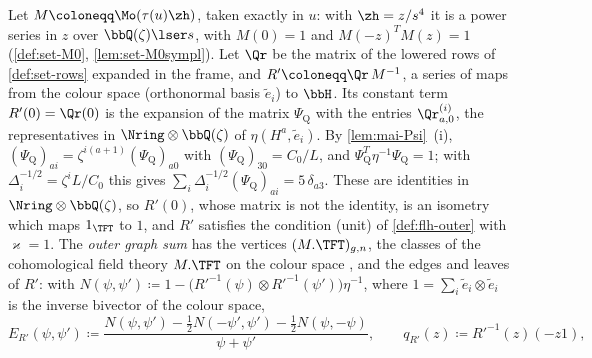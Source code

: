 \begin{defn}
\label{def:set-outer}
Let $M\coloneqq\Mo(\tau(u)\zh)$, taken exactly in $u$: with $\zh=z/s^4$ it is a power series in $z$ over $\bbQ(\zeta)\lser s$, with $M(0)=1$ and $M(-z)^TM(z)=1$ (\cref{def:set-M0}, \cref{lem:set-M0sympl}). Let $\Qr$ be the matrix of the lowered rows of \cref{def:set-rows} expanded in the frame, and $R'\coloneqq\Qr\,M^{-1}$, a series of maps from the colour space (orthonormal basis $\tilde e_i$) to $\bbH$. Its constant term $R'(0)=\Qr(0)$ is the expansion of the matrix $\Psi_{\mathrm Q}$ with the entries $\Qr^{(i)}_{a,0}$, the representatives in $\Nring\otimes\bbQ(\zeta)$ of $\eta(H^a,\tilde e_i)$. By \cref{lem:mai-Psi}~(i), $(\Psi_{\mathrm Q})_{ai}=\zeta^{i(a+1)}(\Psi_{\mathrm Q})_{a0}$ with $(\Psi_{\mathrm Q})_{30}=C_0/L$, and $\Psi_{\mathrm Q}^T\eta^{-1}\Psi_{\mathrm Q}=1$; with $\Delta_i^{-1/2}=\zeta^iL/C_0$ this gives $\sum_i\Delta_i^{-1/2}(\Psi_{\mathrm Q})_{ai}=5\,\delta_{a3}$. These are identities in $\Nring\otimes\bbQ(\zeta)$, so $R'(0)$, whose matrix is not the identity, is an isometry which maps $1_{\TFT}$ to $1$, and $R'$ satisfies the condition (unit) of \cref{def:flh-outer} with $\varkappa=1$. The \emph{outer graph sum} has the vertices $(M.\TFT)_{g,n}$, the classes of the cohomological field theory $M.\TFT$ on the colour space \cite[Def.~2.13]{PPZ15}, and the edges and leaves of $R'$: with $N(\psi,\psi')\coloneqq1-\bigl(R'^{-1}(\psi)\otimes R'^{-1}(\psi')\bigr)\eta^{-1}$, where $1=\sum_i\tilde e_i\otimes\tilde e_i$ is the inverse bivector of the colour space,
\[
E_{R'}(\psi,\psi')\coloneqq\frac{N(\psi,\psi')-\frac12N(-\psi',\psi')-\frac12N(\psi,-\psi)}{\psi+\psi'},\qquad q_{R'}(z)\coloneqq R'^{-1}(z)(-z1),
\]

\end{defn}
